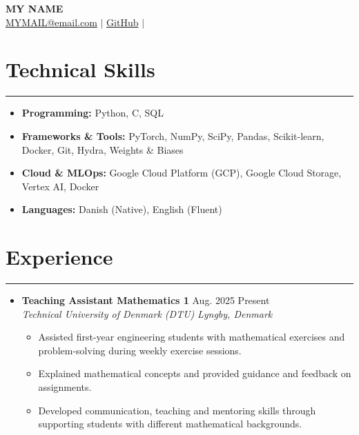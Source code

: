 \documentclass[letterpaper, 10pt]{article}
\begin{document}
\begin{center}
\textbf{\LARGE MY NAME} \\ \vspace{2pt}
\href{mailto:yourmail@email.com}{MYMAIL@email.com} $|$
\href{https://github.com/yourid}{GitHub} $|$
\end{center}

\section*{Technical Skills}
\hrule
\vspace{4pt}
\begin{itemize}
\item[] \textbf{Programming:} Python, C, SQL
\item[] \textbf{Frameworks \& Tools:} PyTorch, NumPy, SciPy,
  Pandas, Scikit-learn, Docker, Git, Hydra, Weights \& Biases
\item[] \textbf{Cloud \& MLOps:} Google Cloud Platform (GCP),
  Google Cloud Storage, Vertex AI, Docker
\item[] \textbf{Languages:} Danish (Native), English (Fluent)
\end{itemize}

\section*{Experience}
\hrule
\vspace{4pt}
\begin{itemize}
\item[]
\textbf{Teaching Assistant Mathematics 1}
\hfill Aug. 2025  Present \\
\textit{Technical University of Denmark (DTU)}
\hfill \textit{Lyngby, Denmark}
\begin{itemize}
    \item Assisted first-year engineering students with
    mathematical exercises and problem-solving during weekly exercise sessions.
    \item Explained mathematical concepts and provided  guidance and feedback on assignments.
    \item Developed communication, teaching and mentoring skills through supporting students with different
    mathematical backgrounds.
\end{itemize}
\end{itemize}
\end{document}
